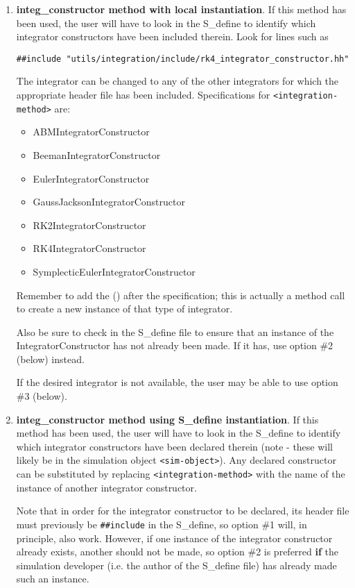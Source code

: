 \begin{enumerate}
 \item \textbf{integ\_constructor method with local instantiation}.
 If this method has been used, the
 user will have to look in the S\_define to identify which integrator
 constructors have been included therein.  Look for lines such as

 \verb+##include "utils/integration/include/rk4_integrator_constructor.hh"+

 The integrator can be changed to any of the other integrators for which the
 appropriate header file has been included.  Specifications for
 \verb+<integration-method>+ are:
 \begin{itemize}
  \item ABMIntegratorConstructor
  \item BeemanIntegratorConstructor
  \item EulerIntegratorConstructor
  \item GaussJacksonIntegratorConstructor
  \item RK2IntegratorConstructor
  \item RK4IntegratorConstructor
  \item SymplecticEulerIntegratorConstructor
 \end{itemize}

 Remember to add the () after the specification; this is actually a method
 call to create a new instance of that type of integrator.

 Also be sure to check in the S\_define file to ensure that an instance of the
 IntegratorConstructor has not already been made.  If it has, use option \#2
 (below) instead.

 If the desired integrator is not available, the user may be able to use
 option \#3 (below).


 \item \textbf{integ\_constructor method using S\_define instantiation}.
 If this method has been used,
 the user will have to look in the S\_define to identify which integrator
 constructors have been declared therein (note - these will likely be in the
 simulation object \verb+<sim-object>+).  Any declared constructor can be
 substituted by replacing \verb+<integration-method>+ with the name of
 the instance of another integrator constructor.

 Note that in order for the integrator constructor to be declared, its header
 file must previously be \verb+##include+ in the S\_define, so option \#1
 will, in principle, also work.
 However, if one instance of the integrator
 constructor already exists, another should not be made, so option \#2 is
 preferred \textbf{if} the simulation developer (i.e. the author of the
 S\_define file) has already made such an
 instance.


\end{enumerate}
